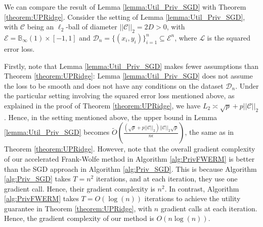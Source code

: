 \documentclass{article}
\begin{document}
We can compare the result of Lemma \ref{lemma:Util_Priv_SGD} with Theorem \ref{theorem:UPRidge}.
Consider the setting of Lemma \ref{lemma:Util_Priv_SGD}, with $\mathcal{C}$ being an $\ell_2$-ball of diameter $||\mathcal{C}||_2 = 2D > 0$, with $\mathcal{E} = \mathbb{B}_\infty(1) \times [-1, 1]$ and $\mathcal{D}_n = \{(x_i, y_i)\}_{i = 1}^n \subseteq \mathcal{E}^n$, where $\mathcal{L}$ is the squared error loss.

Firstly, note that Lemma \ref{lemma:Util_Priv_SGD} makes fewer assumptions than Theorem \ref{theorem:UPRidge}: Lemma \ref{lemma:Util_Priv_SGD} does not assume the loss to be smooth and does not have any conditions on the dataset $\mathcal{D}_n$. Under the particular setting involving the squared error loss mentioned above, as explained in the proof of Theorem \ref{theorem:UPRidge}, we have $L_2 \asymp \sqrt{p} + p||\mathcal{C}||_2$. Hence, in the setting mentioned above, the upper bound in Lemma \ref{lemma:Util_Priv_SGD} becomes $\widetilde{O}\left(\frac{(\sqrt{p} + p||\mathcal{C}||_2)||\mathcal{C}||_2\sqrt{p}}{n\epsilon}\right)$, the same as in Theorem \ref{theorem:UPRidge}. However, note that the overall gradient complexity of our accelerated Frank-Wolfe method in Algorithm \ref{alg:PrivFWERM} is better than the SGD approach in Algorithm \ref{alg:Priv_SGD}. This is because Algorithm \ref{alg:Priv_SGD} takes $T = n^2$ iterations, and at each iteration, they use one gradient call. Hence, their gradient complexity is $n^2$. In contrast, Algorithm \ref{alg:PrivFWERM} takes $T = O(\log(n))$ iterations to achieve the utility guarantee in Theorem \ref{theorem:UPRidge}, with $n$ gradient calls at each iteration. Hence, the gradient complexity of our method is $O(n\log(n))$.

\end{document}
